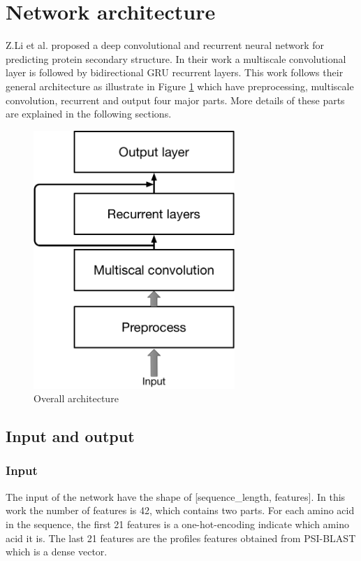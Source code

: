 \section{Network architecture}
Z.Li et al. \cite{Z.Li2016} proposed a deep convolutional and recurrent neural network for predicting protein secondary structure. In their work a multiscale convolutional layer is followed by bidirectional GRU recurrent layers. This work follows their general architecture as illustrate in Figure \ref{fig:overall_arch} which have preprocessing, multiscale convolution, recurrent and output four major parts. More details of these parts are explained in the following sections.
\begin{figure}[H] 
	\centering
	\includegraphics[width=3in]{Figures/overall_architecture}
	\caption[Overall architecture]{Overall architecture}
	\label{fig:overall_arch}
\end{figure}


\subsection{Input and output}
\subsubsection{Input}
The input of the network have the shape of [sequence\_length, features]. In this work the number of features is 42, which contains two parts. For each amino acid in the sequence, the first 21 features is a one-hot-encoding indicate which amino acid it is. The last 21 features are the profiles features obtained from PSI-BLAST\cite{altschul1997gapped} which is a dense vector.
